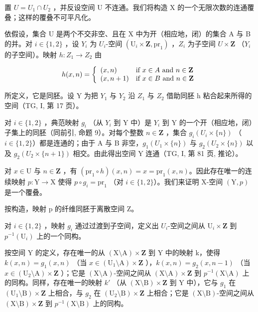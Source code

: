 置 \(U = U_{1} \cap U_{2}\) ，并反设空间 U 不连通。我们将构造 X 的一个无限次数的连通覆叠；这样的覆叠不可平凡化。

依假设，集合 U 是两个不交非空、且在 X 中为开（相应地，闭）的集合 A 与 B 的并。对 \(i \in \{1, 2\}\) ，设 \(Y_i\) 为 \(U_i\)-空间 \((\mathrm{U}_i \times \mathbf{Z}, \mathrm{pr}_1)\) ，\(Z_i\) 为子空间 \(U \times \mathbf{Z}\) （\(Y_i\) 的子空间）。映射 \(h: Z_1 \to Z_2\) 由

\[
h (x, n) = \left\{ \begin{array}{l l} (x, n) & \text {if } x\in A \text { and } n\in \mathbf {Z} \\ (x, n + 1) & \text {if } x\in B \text { and } n\in \mathbf {Z} \end{array} \right.
\]

所定义，它是同胚。设 Y 为把 \(Y_{1}\) 与 \(Y_{2}\) 沿 \(Z_{1}\) 与 \(Z_{2}\) 借助同胚 h 粘合起来所得的空间（TG, I, 第 17 页）。

对 \(i \in \{1,2\}\) ，典范映射 \(g_i\) （从 \(Y_i\) 到 Y 中）是 \(Y_i\) 到 Y 的一个开（相应地，闭）子集上的同胚（同前引, 命题 9）。对每个整数 \(n \in \mathbf{Z}\) ，集合 \(g_i(U_i \times \{n\})\) （\(i \in \{1,2\}\)）都是连通的；由于 A 与 B 非空，\(g_1(U_1 \times \{n\})\) 与 \(g_2(U_2 \times \{n\})\) 以及 \(g_2(U_2 \times \{n+1\})\) 相交。由此得出空间 Y 连通（TG, I, 第 81 页, 推论）。

对 \(x \in \mathrm{U}\) 与 \(n \in \mathbf{Z}\) ，有 \((\mathrm{pr}_1 \circ h)(x, n) = x = \mathrm{pr}_1(x, n)\)。因此存在唯一的连续映射 \(p \colon \mathrm{Y} \to \mathrm{X}\) 使得 \(p \circ g_i = \mathrm{pr}_1\) （对 \(i \in \{1, 2\}\)）。我们来证明 X-空间 \((\mathrm{Y}, p)\) 是一个覆叠。

按构造，映射 p 的纤维同胚于离散空间 Z。

对 \(i \in \{1,2\}\) ，映射 \(g_i\) 通过过渡到子空间，定义出 \(U_i\)-空间之间从 \(\mathrm{U}_i \times \mathbf{Z}\) 到 \(p^{-1}(\mathrm{U}_i)\) 上的一个同构。

按空间 Y 的定义，存在唯一的从 \((\mathrm{X}\setminus\mathrm{A})\times\mathbf{Z}\) 到 Y 中的映射 k，使得 \(k(x,n)=g_{1}(x,n)\) （当 \(x\in(\mathrm{U}_{1}\setminus\mathrm{A})\times\mathbf{Z}\) ），\(k(x,n)=g_{2}(x,n-1)\) （当 \(x\in(\mathrm{U}_{2}\setminus\mathrm{A})\times\mathbf{Z}\) ）；它是 \((\mathrm{X}\setminus\mathrm{A})\)-空间之间从 \((\mathrm{X}\setminus\mathrm{A})\times\mathbf{Z}\) 到 \(p^{-1}(\mathrm{X}\setminus\mathrm{A})\) 上的同构。同样，存在唯一的映射 \(k'\) （从 \((\mathrm{X}\setminus\mathrm{B})\times\mathbf{Z}\) 到 Y 中），它与 \(g_{1}\) 在 \((\mathrm{U}_{1}\setminus\mathrm{B})\times\mathbf{Z}\) 上相合，与 \(g_{2}\) 在 \((\mathrm{U}_{2}\setminus\mathrm{B})\times\mathbf{Z}\) 上相合；它是 \((\mathrm{X}\setminus\mathrm{B})\)-空间之间从 \((\mathrm{X}\setminus\mathrm{B})\times\mathbf{Z}\) 到 \(p^{-1}(\mathrm{X}\setminus\mathrm{B})\) 上的同构。

